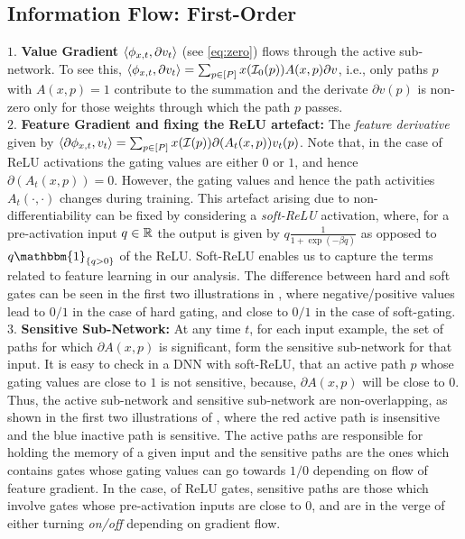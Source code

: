\subsection{Information Flow: First-Order}
$1.$ \textbf{Value Gradient} $\langle \phi_{x,t},\partial v_t\rangle$ (see \eqref{eq:zero}) flows through the active sub-network. To see this, $\langle \phi_{x,t},\partial v_t\rangle=\sum_{p\in[P]}x(\mathcal{I}_0(p))A(x,p)\partial v$, i.e., only paths $p$ with $A(x,p)=1$ contribute to the summation and the derivate $\partial v(p)$ is non-zero only for those weights through which the path $p$ passes.\\
$2.$ \textbf{Feature Gradient and fixing the ReLU artefact:} The \emph{feature derivative} given by $\langle \partial\phi_{x,t},v_t\rangle=\sum_{p\in [P]}x(\mathcal{I}(p)) \partial(A_t(x,p)) v_t(p)$. Note that, in the case of ReLU activations the gating values are either $0$ or $1$, and hence $\partial(A_t(x,p))=0$. However, the gating values and hence the path activities $A_t(\cdot,\cdot)$ changes during training. This artefact arising due to non-differentiability can be fixed by considering a \emph{soft-ReLU} activation, where, for a pre-activation input $q\in\mathbb{R}$ the output is given by $q\frac{1}{1+\exp(-\beta q)}$ as opposed to $q\mathbbm{1}_{\{q>0\}}$ of the ReLU. Soft-ReLU enables us to capture the terms related to feature learning in our analysis. The difference between hard and soft gates can be seen in the first two illustrations in , where negative/positive values lead to $0/1$ in the case of hard gating, and close to $0/1$ in the case of soft-gating.\\
$3.$ \textbf{Sensitive Sub-Network:} At any time $t$, for each input example, the set of paths for which $\partial A(x,p)$ is significant, form the sensitive sub-network for that input. It is easy to check in a DNN with soft-ReLU, that an active path $p$ whose gating values are close to $1$ is not sensitive, because, $\partial A(x,p)$ will be close to $0$. Thus, the active sub-network and sensitive sub-network are non-overlapping, as shown in the first two illustrations of , where the red active path is insensitive and the blue inactive path is sensitive. The active paths are responsible for holding the memory of a given input and the sensitive paths are the ones which contains gates whose gating values can go towards $1/0$ depending on flow of feature gradient. In the case, of ReLU gates, sensitive paths are those which involve gates whose pre-activation inputs are close to $0$, and are in the verge of either turning \emph{on/off} depending on gradient flow.
